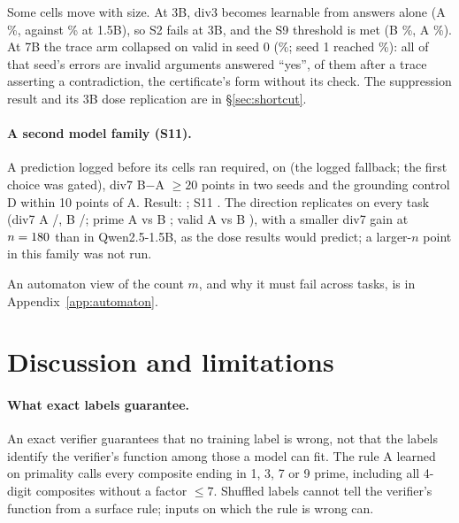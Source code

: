 \documentclass{article}
\theoremstyle{definition}
\begin{document}
Some cells move with size. At 3B, div3 becomes learnable from answers alone (A \threeBdivthreeA\%, against \divthreeA\% at 1.5B), so S2 fails at 3B, and the S9 threshold is met (B \threeBdivthirteenBnThreeSixtysZero\%, A \threeBdivthirteenAnThreeSixtysZero\%). At 7B the trace arm collapsed on valid in seed 0 (\sevenBvalidBsZero\%; seed 1 reached \sevenBvalidBsOne\%): all \sevenBvalidBerrYes{} of that seed's \sevenBvalidBerrN{} errors are invalid arguments answered ``yes'', \sevenBvalidBerrTemplate{} of them after a trace asserting a contradiction, the certificate's form without its check. The suppression result and its 3B dose replication are in \S\ref{sec:shortcut}.

\paragraph{A second model family (S11).} A prediction logged before its cells ran required, on \secondFamilyModel{} (the logged fallback; the first choice was gated), div7 B$-$A $\ge20$ points in two seeds and the grounding control D within 10 points of A. Result: \SElevenResult; S11 \SElevenVerdict. The direction replicates on every task (div7 A \famDivsevenAsZero/\famDivsevenAsOne, B \famDivsevenBsZero/\famDivsevenBsOne; prime A \famPrimeAsZero{} vs B \famPrimeBsZero; valid A \famValidAsZero{} vs B \famValidBsZero), with a smaller div7 gain at $n=180$ than in Qwen2.5-1.5B, as the dose results would predict; a larger-$n$ point in this family was not run.

An automaton view of the count $m$, and why it must fail across tasks, is in Appendix~\ref{app:automaton}.

\section{Discussion and limitations}
\label{sec:discussion}
\paragraph{What exact labels guarantee.} An exact verifier guarantees that no training label is wrong, not that the labels identify the verifier's function among those a model can fit. The rule A learned on primality calls every composite ending in 1, 3, 7 or 9 prime, including all \hardNegPop{} 4-digit composites without a factor $\le 7$. Shuffled labels cannot tell the verifier's function from a surface rule; inputs on which the rule is wrong can.
\end{document}
